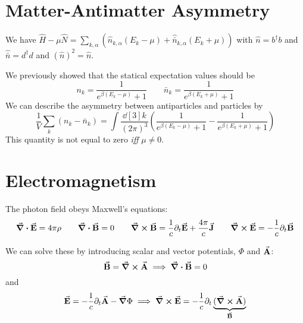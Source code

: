 \documentclass[a4paper,twoside,master.tex]{subfiles}
\begin{document}

\section{Matter-Antimatter Asymmetry}\label{sec:matter-antimatter_asymmetry}

We have $ \hat{H} - \mu \hat{N} = \sum_{k, \alpha} \left( \hat{n}_{k, \alpha} (E_k - \mu) + \hat{\bar{n}}_{k, \alpha} (E_k + \mu) \right) $ with $ \hat{n} = b^\dagger b $ and $ \hat{\bar{n}} = d^\dagger d $ and $ (\hat{n})^2 = \hat{n} $.

We previously showed that the statical expectation values should be
\begin{equation}
    n_k = \frac{1}{e^{\beta (E_k - \mu)} + 1} \qquad \bar{n}_k = \frac{1}{e^{\beta (E_k + \mu)} + 1}
\end{equation}
We can describe the asymmetry between antiparticles and particles by
\begin{equation}
    \frac{1}{V} \sum_k (n_k - \bar{n}_k) = \int \frac{\dd[3]{k}}{(2 \pi)^3} \left( \frac{1}{e^{\beta (E_k - \mu)} + 1} - \frac{1}{e^{\beta (E_k + \mu)} + 1} \right)
\end{equation}
This quantity is not equal to zero \textit{iff} $ \mu \neq 0 $.

\section{Electromagnetism}\label{sec:electromagnetism}

The photon field obeys Maxwell's equations:
\begin{equation}
    \div{\va{E}} = 4 \pi \rho \qquad \div{\va{B}} = 0 \qquad \curl{\va{B}} = \frac{1}{c} \partial_t \va{E} + \frac{4 \pi}{c} \va{J} \qquad \curl{\va{E}} = - \frac{1}{c} \partial_t \va{B}
\end{equation}

We can solve these by introducing scalar and vector potentials, $ \Phi $ and $ \va{A} $:
\begin{equation}
    \va{B} = \curl{\va{A}} \implies \div{\va{B}} = 0
\end{equation}
and
\begin{equation}
    \va{E} = - \frac{1}{c} \partial_t \va{A} - \grad{\Phi} \implies \curl{\va{E}} = - \frac{1}{c} \partial_t \underbrace{(\curl{\va{A}})}_{\va{B}}
\end{equation}
\end{document}

